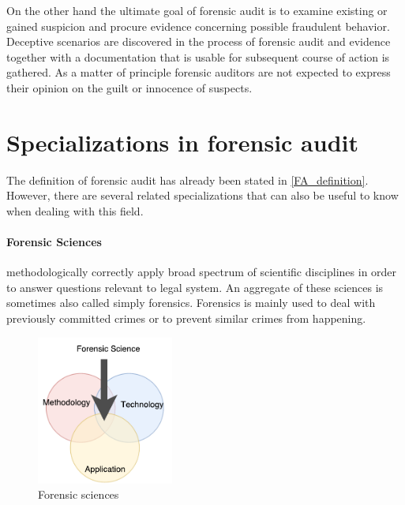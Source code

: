 On the other hand the ultimate goal of forensic audit is to examine existing or gained suspicion and procure evidence concerning possible fraudulent behavior. Deceptive scenarios are discovered in the process of forensic audit and evidence together with a documentation that is usable for subsequent course of action is gathered. As a matter of principle forensic auditors are not expected to express their opinion on the guilt or innocence of suspects.


\section{Specializations in forensic audit}
The definition of forensic audit has already been stated in \ref{FA_definition}. However, there are several related specializations that can also be useful to know when dealing with this field.

\paragraph{Forensic Sciences} methodologically correctly apply broad spectrum of scientific disciplines in order to answer questions relevant to legal system. \cite{kyfranke} An aggregate of these sciences is sometimes also called simply forensics. Forensics is mainly used to deal with previously committed crimes or to prevent similar crimes from happening.


\begin{figure}[h]
	\begin{center} 
	\includegraphics[width=0.4\textwidth]{img/forensic_science.pdf}
	\end{center}
	\caption{Forensic sciences}
\end{figure}

